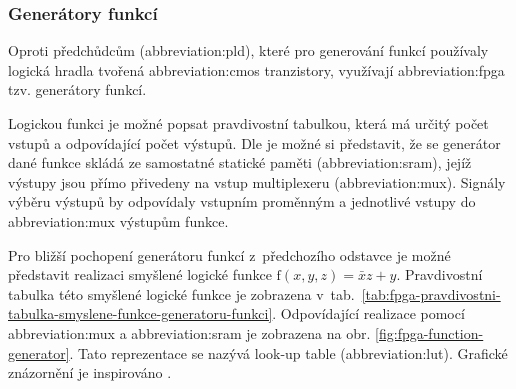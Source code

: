 \documentclass[a4paper, twoside, 11pt]{article}
\begin{document}
		\subsubsection{Generátory funkcí}\label{subsubsec:generatory-funkci}
		Oproti předchůdcům (\gls{abbreviation:pld}), které pro generování funkcí používaly logická hradla tvořená \gls{abbreviation:cmos} tranzistory, využívají \gls{abbreviation:fpga} tzv. generátory funkcí.\par
		Logickou funkci je možné popsat pravdivostní tabulkou, která má určitý počet vstupů a odpovídající počet výstupů. Dle \cite{Sass2010} je možné si představit, že se generátor dané funkce skládá ze samostatné statické paměti (\gls{abbreviation:sram}), jejíž výstupy jsou přímo přivedeny na vstup multiplexeru (\gls{abbreviation:mux}). Signály výběru výstupů by odpovídaly vstupním proměnným a jednotlivé vstupy do \gls{abbreviation:mux} výstupům funkce.\par
		Pro bližší pochopení generátoru funkcí z~předchozího odstavce je možné představit realizaci smyšlené logické funkce $\text{f} (x, y, z) = \bar{x}z + y$. Pravdivostní tabulka této smyšlené logické funkce je zobrazena v~tab.~\ref{tab:fpga-pravdivostni-tabulka-smyslene-funkce-generatoru-funkci}. Odpovídající realizace pomocí \gls{abbreviation:mux} a \gls{abbreviation:sram} je zobrazena na obr. \ref{fig:fpga-function-generator}. Tato reprezentace se nazývá look-up table (\gls{abbreviation:lut}). Grafické znázornění je inspirováno \cite{Sass2010}.
		
\end{document}
